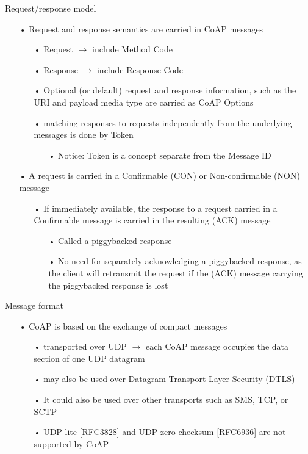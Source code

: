 \documentclass[11pt]{beamer}
\begin{document}
\begin{frame}{Request/response model}
\begin{itemize}
\item[•] Request and response semantics are carried in CoAP messages
\begin{itemize}
\item[•] Request $\rightarrow$ include Method Code
\item[•] Response $\rightarrow$ include Response Code
\item[•] Optional (or default) request and response information, such as the URI and payload media type are carried as CoAP Options
\item[•] matching responses to requests independently from the underlying messages is done by Token
\begin{itemize}
\item[•] Notice: Token is a concept separate from the Message ID
\end{itemize}
\end{itemize}
\item[•] A request is carried in a Confirmable (CON) or Non-confirmable (NON) message
\begin{itemize}
\item[•] If immediately available, the response to a request carried in a Confirmable message is carried in the resulting (ACK) message
\begin{itemize}
\item[•] Called a piggybacked response
\item[•] No need for separately acknowledging a piggybacked response, as the client will retransmit the request if the (ACK) message carrying the piggybacked response is lost
\end{itemize}
\end{itemize}
\end{itemize}
\end{frame}
\begin{frame}{Message format}
\begin{itemize}
\item[•] CoAP is based on the exchange of compact messages
\begin{itemize}
\item[•] transported over UDP $\rightarrow$ each CoAP message occupies the data section of one UDP datagram
\item[•] may also be used over Datagram Transport Layer Security (DTLS)
\item[•] It could also be used over other transports such as SMS, TCP, or SCTP
\item[•] UDP-lite [RFC3828] and UDP zero checksum [RFC6936] are not supported by CoAP
\end{itemize}
\end{itemize}
\end{frame}
\end{document}
